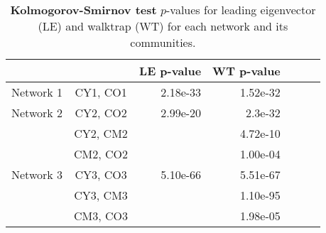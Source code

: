\begin{table}
\centering
\caption[Kolmogorov-Smirnov test]{\textbf{Kolmogorov-Smirnov test} $p$-values for leading eigenvector (LE) and walktrap (WT) for each network and its communities.}
\label{tab:pvalues2}
\vspace*{5mm}
\begin{tabular}{lcrrrrr}
	\toprule

	\rowcolor{Gray}
	 & & LE p-value & WT p-value\\
	\midrule 
	\quad Network 1     & CY1, CO1 & 2.18e-33 & 1.52e-32 \\
	\midrule   							
	\quad Network 2     & CY2, CO2 & 2.99e-20 & 2.3e-32 \\
					    & CY2, CM2 &          & 4.72e-10\\
					    & CM2, CO2 &          & 1.00e-04\\
	\midrule  
	\quad Network 3     & CY3, CO3 & 5.10e-66 & 5.51e-67\\
					    & CY3, CM3 &          & 1.10e-95\\
						& CM3, CO3 &          & 1.98e-05\\ 
	\bottomrule
\end{tabular}
\end{table}